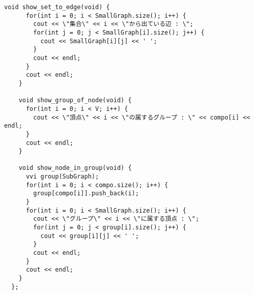 \documentclass{jsarticle}
\begin{document}
\begin{lstlisting}[caption=StronglyConnectedComponent]
    void show_set_to_edge(void) {
      for(int i = 0; i < SmallGraph.size(); i++) {
        cout << \"集合\" << i << \"から出ている辺 : \";
        for(int j = 0; j < SmallGraph[i].size(); j++) {
          cout << SmallGraph[i][j] << ' ';
        }
        cout << endl;
      }
      cout << endl;
    }
  
    void show_group_of_node(void) {
      for(int i = 0; i < V; i++) {
        cout << \"頂点\" << i << \"の属するグループ : \" << compo[i] << endl;
      }
      cout << endl;
    }
  
    void show_node_in_group(void) {
      vvi group(SubGraph);
      for(int i = 0; i < compo.size(); i++) {
        group[compo[i]].push_back(i);
      }
      for(int i = 0; i < SmallGraph.size(); i++) {
        cout << \"グループ\" << i << \"に属する頂点 : \";
        for(int j = 0; j < group[i].size(); j++) {
          cout << group[i][j] << ' ';
        }
        cout << endl;
      }
      cout << endl;
    }
  };
  

\end{lstlisting}

\color{white}
\end{document}
